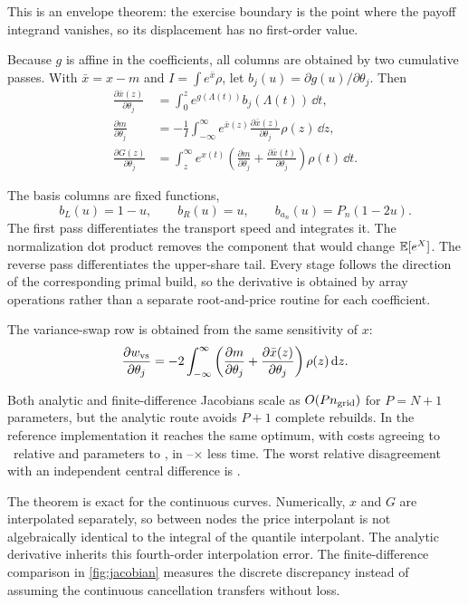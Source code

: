 This is an envelope theorem: the exercise boundary is the point where the
payoff integrand vanishes, so its displacement has no first-order value.

Because $g$ is affine in the coefficients, all columns are obtained by two
cumulative passes.  With $\bar x=x-m$ and
$I=\int e^{\bar x}\rho$, let $b_j(u)=\partial g(u)/\partial\theta_j$.  Then
\begin{align}
\frac{\partial\bar x(z)}{\partial\theta_j}
&=\int_0^ze^{g(\Lambda(t))}b_j(\Lambda(t))\,\dd t,
\label{eq:pass1}\\
\frac{\partial m}{\partial\theta_j}
&=-\frac1I\int_{-\infty}^\infty
e^{\bar x(z)}\frac{\partial\bar x(z)}{\partial\theta_j}\rho(z)\,\dd z,
\label{eq:pass2}\\
\frac{\partial G(z)}{\partial\theta_j}
&=\int_z^\infty e^{x(t)}
\left(\frac{\partial m}{\partial\theta_j}
+\frac{\partial\bar x(t)}{\partial\theta_j}\right)\rho(t)\,\dd t.
\label{eq:pass3}
\end{align}

The basis columns are fixed functions,
\[
b_L(u)=1-u,\qquad b_R(u)=u,\qquad b_{a_n}(u)=P_n(1-2u).
\]
The first pass differentiates the transport speed and integrates it.  The
normalization dot product removes the component that would change
$\mathbb{E}[e^X]$.  The reverse pass differentiates the upper-share tail.  Every
stage follows the direction of the corresponding primal build, so the
derivative is obtained by array operations rather than a separate
root-and-price routine for each coefficient.

The variance-swap row is obtained from the same sensitivity of $x$:
\begin{equation}
\frac{\partial w_{\rm vs}}{\partial\theta_j}
=-2\int_{-\infty}^\infty
\left(\frac{\partial m}{\partial\theta_j}
+\frac{\partial\bar x(z)}{\partial\theta_j}\right)\rho(z)\,\mathrm{d} z.
\label{eq:varswaprow}
\end{equation}

Both analytic and finite-difference Jacobians scale as
$O(Pn_{\rm grid})$ for $P=N+1$ parameters, but the analytic route avoids
$P+1$ complete rebuilds.  In the reference implementation it reaches the
same optimum, with costs agreeing to \MacJacSameOptCost\ relative and
parameters to \MacJacSameOptParams, in
\MacJacSpeedupMin--\MacJacSpeedupMax$\times$ less time.  The worst relative
disagreement with an independent central difference is \MacJacFdMaxRel.

The theorem is exact for the continuous curves.  Numerically, $x$ and $G$ are
interpolated separately, so between nodes the price interpolant is not
algebraically identical to the integral of the quantile interpolant.  The
analytic derivative inherits this fourth-order interpolation error.  The
finite-difference comparison in \cref{fig:jacobian} measures the discrete
discrepancy instead of assuming the continuous cancellation transfers
without loss.

